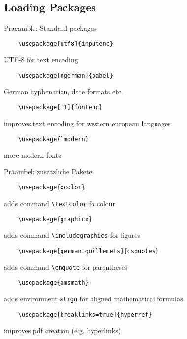 \subsection{Loading Packages}

\begin{frame}[fragile]{Praeamble: Standard packages}
  
  \begin{lstlisting}
    \usepackage[utf8]{inputenc}
  \end{lstlisting}
  UTF-8 for text encoding
  
  \begin{lstlisting}
    \usepackage[ngerman]{babel}
  \end{lstlisting}
  German hyphenation, date formats etc.
  
  \begin{lstlisting}
    \usepackage[T1]{fontenc}
  \end{lstlisting}
  improves text encoding for western european languages
  
  \begin{lstlisting}
    \usepackage{lmodern}
  \end{lstlisting}
  more modern fonts
\end{frame}

\begin{frame}[fragile]{Präambel: zusätzliche Pakete}

  \begin{lstlisting}
    \usepackage{xcolor}
  \end{lstlisting}
  adds command \lstinline-\textcolor- fo colour

  \begin{lstlisting}
    \usepackage{graphicx}  
  \end{lstlisting}
  adds command \lstinline-\includegraphics- for figures

  \begin{lstlisting}
    \usepackage[german=guillemets]{csquotes}
  \end{lstlisting}
  adds command \lstinline-\enquote- for parentheses

  \begin{lstlisting}
    \usepackage{amsmath}
  \end{lstlisting}
  adds environment \lstinline-align- for aligned mathematical formulas

  \begin{lstlisting}
    \usepackage[breaklinks=true]{hyperref}
  \end{lstlisting}
  improves pdf creation (e.g. hyperlinks)
\end{frame}
